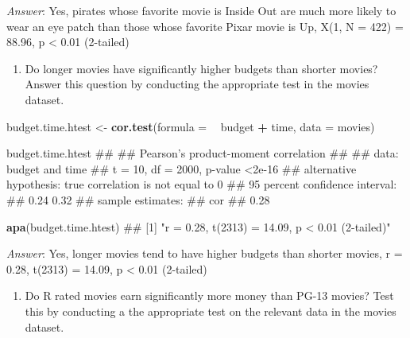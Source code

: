 \documentclass[]{book}
\newenvironment{Shaded}{\begin{snugshade}}{\end{snugshade}}
\newcommand{\KeywordTok}[1]{\textcolor[rgb]{0.13,0.29,0.53}{\textbf{#1}}}
\newcommand{\DataTypeTok}[1]{\textcolor[rgb]{0.13,0.29,0.53}{#1}}
\newcommand{\StringTok}[1]{\textcolor[rgb]{0.31,0.60,0.02}{#1}}
\newcommand{\OperatorTok}[1]{\textcolor[rgb]{0.81,0.36,0.00}{\textbf{#1}}}
\newcommand{\NormalTok}[1]{#1}
\providecommand{\tightlist}{%
  \setlength{\itemsep}{0pt}\setlength{\parskip}{0pt}}
\theoremstyle{definition}
\theoremstyle{definition}
\theoremstyle{remark}
\begin{document}
\emph{Answer}: Yes, pirates whose favorite movie is Inside Out are much
more likely to wear an eye patch than those whose favorite Pixar movie
is Up, X(1, N = 422) = 88.96, p \textless{} 0.01 (2-tailed)

\begin{enumerate}
\def\labelenumi{\arabic{enumi}.}
\setcounter{enumi}{2}
\tightlist
\item
  Do longer movies have significantly higher budgets than shorter
  movies? Answer this question by conducting the appropriate test in the
  movies dataset.
\end{enumerate}

\begin{Shaded}
\begin{Highlighting}[]
\NormalTok{budget.time.htest <-}\StringTok{ }\KeywordTok{cor.test}\NormalTok{(}\DataTypeTok{formula =} \OperatorTok{~}\StringTok{ }\NormalTok{budget }\OperatorTok{+}\StringTok{ }\NormalTok{time,}
                              \DataTypeTok{data =}\NormalTok{ movies)}

\NormalTok{budget.time.htest}
\NormalTok{## }
\NormalTok{##  Pearson's product-moment correlation}
\NormalTok{## }
\NormalTok{## data:  budget and time}
\NormalTok{## t = 10, df = 2000, p-value <2e-16}
\NormalTok{## alternative hypothesis: true correlation is not equal to 0}
\NormalTok{## 95 percent confidence interval:}
\NormalTok{##  0.24 0.32}
\NormalTok{## sample estimates:}
\NormalTok{##  cor }
\NormalTok{## 0.28}

\KeywordTok{apa}\NormalTok{(budget.time.htest)}
\NormalTok{## [1] "r = 0.28, t(2313) = 14.09, p < 0.01 (2-tailed)"}
\end{Highlighting}
\end{Shaded}

\emph{Answer}: Yes, longer movies tend to have higher budgets than
shorter movies, r = 0.28, t(2313) = 14.09, p \textless{} 0.01 (2-tailed)

\begin{enumerate}
\def\labelenumi{\arabic{enumi}.}
\setcounter{enumi}{3}
\tightlist
\item
  Do R rated movies earn significantly more money than PG-13 movies?
  Test this by conducting a the appropriate test on the relevant data in
  the movies dataset.
\end{enumerate}
\end{document}
